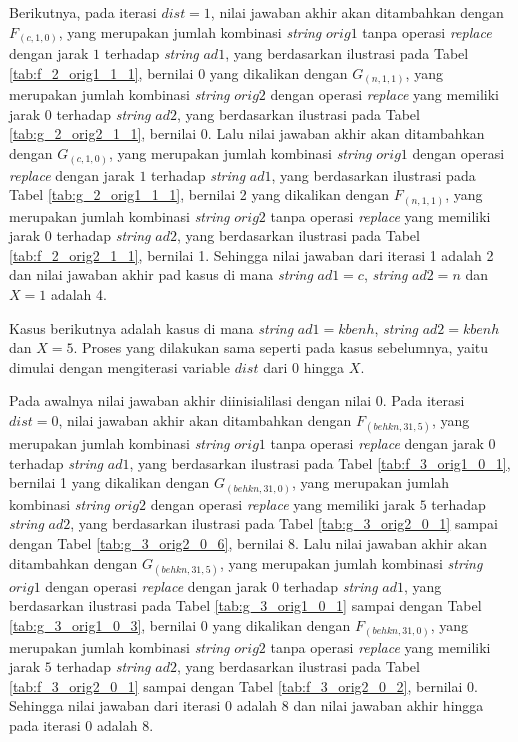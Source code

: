 Berikutnya, pada iterasi $ dist = 1 $, nilai jawaban akhir akan ditambahkan dengan $ F_{(c, 1,0)} $, yang merupakan jumlah kombinasi \textit{string} $ orig1 $ tanpa operasi \textit{replace} dengan jarak $ 1 $ terhadap \textit{string} $ ad1 $, yang berdasarkan ilustrasi pada Tabel \ref{tab:f_2_orig1_1_1}, bernilai 0 yang dikalikan dengan $ G_{(n, 1,1)} $, yang merupakan jumlah kombinasi \textit{string} $ orig2 $ dengan operasi \textit{replace} yang memiliki jarak $ 0 $ terhadap \textit{string} $ ad2 $, yang berdasarkan ilustrasi pada Tabel \ref{tab:g_2_orig2_1_1}, bernilai 0. Lalu nilai jawaban akhir akan ditambahkan dengan $ G_{(c, 1,0)} $, yang merupakan jumlah kombinasi \textit{string} $ orig1 $ dengan operasi \textit{replace} dengan jarak $ 1 $ terhadap \textit{string} $ ad1 $, yang berdasarkan ilustrasi pada Tabel \ref{tab:g_2_orig1_1_1}, bernilai 2 yang dikalikan dengan $ F_{(n, 1,1)} $, yang merupakan jumlah kombinasi \textit{string} $ orig2 $ tanpa operasi \textit{replace} yang memiliki jarak $ 0 $ terhadap \textit{string} $ ad2 $, yang berdasarkan ilustrasi pada Tabel \ref{tab:f_2_orig2_1_1}, bernilai 1. Sehingga nilai jawaban dari iterasi 1 adalah 2 dan nilai jawaban akhir pad kasus di mana \textit{string} $ ad1=c $, \textit{string} $ ad2=n $ dan $ X=1 $ adalah 4.

Kasus berikutnya adalah kasus di mana \textit{string} $ ad1=kbenh $, \textit{string} $ ad2=kbenh $ dan $ X=5 $. Proses yang dilakukan sama seperti pada kasus sebelumnya, yaitu dimulai dengan mengiterasi variable $ dist $ dari $ 0 $ hingga $ X $.

Pada awalnya nilai jawaban akhir diinisialilasi dengan nilai $ 0 $. Pada iterasi $ dist = 0 $, nilai jawaban akhir akan ditambahkan dengan $ F_{(behkn, 31,5)} $, yang merupakan jumlah kombinasi \textit{string} $ orig1 $ tanpa operasi \textit{replace} dengan jarak $ 0 $ terhadap \textit{string} $ ad1 $, yang berdasarkan ilustrasi pada Tabel \ref{tab:f_3_orig1_0_1}, bernilai 1 yang dikalikan dengan $ G_{(behkn, 31,0)} $, yang merupakan jumlah kombinasi \textit{string} $ orig2 $ dengan operasi \textit{replace} yang memiliki jarak $ 5 $ terhadap \textit{string} $ ad2 $, yang berdasarkan ilustrasi pada Tabel \ref{tab:g_3_orig2_0_1} sampai dengan Tabel \ref{tab:g_3_orig2_0_6}, bernilai 8. Lalu nilai jawaban akhir akan ditambahkan dengan $ G_{(behkn, 31,5)} $, yang merupakan jumlah kombinasi \textit{string} $ orig1 $ dengan operasi \textit{replace} dengan jarak $ 0 $ terhadap \textit{string} $ ad1 $, yang berdasarkan ilustrasi pada Tabel \ref{tab:g_3_orig1_0_1} sampai dengan Tabel \ref{tab:g_3_orig1_0_3}, bernilai 0 yang dikalikan dengan $ F_{(behkn, 31,0)} $, yang merupakan jumlah kombinasi \textit{string} $ orig2 $ tanpa operasi \textit{replace} yang memiliki jarak $ 5 $ terhadap \textit{string} $ ad2 $, yang berdasarkan ilustrasi pada Tabel \ref{tab:f_3_orig2_0_1} sampai dengan Tabel \ref{tab:f_3_orig2_0_2}, bernilai 0. Sehingga nilai jawaban dari iterasi 0 adalah 8 dan nilai jawaban akhir hingga pada iterasi 0 adalah 8.

